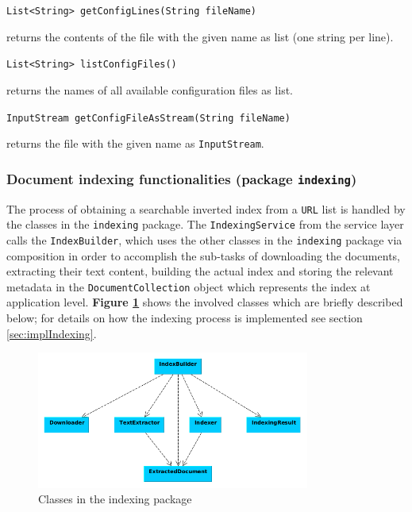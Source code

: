 \documentclass[a4paper]{usiinfbachelorproject}
\begin{document}
\begin{description}
            \item \texttt{List<String> getConfigLines(String fileName)}

                returns the contents of the file with the given name as list (one string per line).

            \item \texttt{List<String> listConfigFiles()}

                returns the names of all available configuration files as list.

            \item \texttt{InputStream getConfigFileAsStream(String fileName)}

                returns the file with the given name as \texttt{InputStream}.

    \end{description}


\subsubsection{\textbf{Document indexing functionalities (package \texttt{indexing})}} \label{sec:archDataLayerIndexing}

The process of obtaining a searchable inverted index from a \texttt{URL} list is handled by the classes in the
\texttt{indexing} package. The \texttt{IndexingService} from the service layer calls the \texttt{IndexBuilder},
which uses the other classes in the \texttt{indexing} package via composition in order to accomplish the sub-tasks of downloading the
documents, extracting their text content, building the actual index and storing the relevant metadata in the 
\texttt{DocumentCollection} object which represents the index at application level. \textbf{Figure \ref{fig:indexingClasses}}
shows the involved classes which are briefly described below; 
for details on how the indexing process is implemented see section \ref{sec:implIndexing}.

\begin{figure}[h!]
\centering
\includegraphics[width=0.8\textwidth]{figures/indexingClasses}
\caption{Classes in the indexing package}
\label{fig:indexingClasses}
\end{figure}
\end{document}
